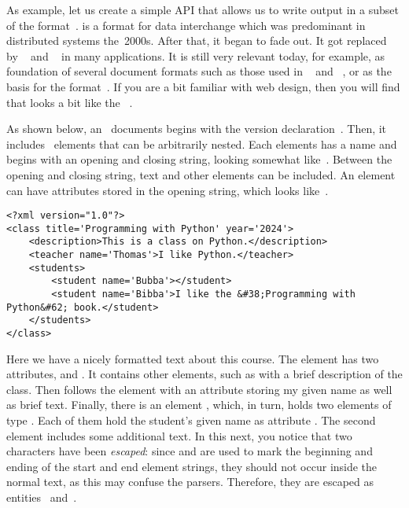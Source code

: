 As example, let us create a simple API that allows us to write output in a subset of the  format~\cite{BPSMM2008EMLX1FE,K2019ITXJY,CH2013XFCAMLTMC}.
 is a format for data interchange which was predominant in distributed systems the~2000s.
After that, it began to fade out.
It got replaced~\cite{A2020XLATDOEOL}  by ~\cite{E2017SE4TJDIS,RFC8259} and ~\cite{DNMAASBE2021YAMLYV1,K2019ITXJY,CGTYB2022YFFDCAIE} in many applications.
It is still very relevant today, for example, as foundation of several document formats such as those used in \libreoffice~\cite{DF2024LTDF,GL2012LTSOOSSCBAFACSOL} and \microsoftWord~\cite{MS2024MW,DR2019STFAWAUMW}, or as the basis for the  format~\cite{DDGLMSWFJJ2011SVGSSE}.
If you are a bit familiar with web design, then you will find that  looks a bit like the ~\cite{HBFLDNOP2014HAVAAAFHAX}.%
%
\begin{sloppypar}%
As shown below, an ~documents begins with the  version declaration~.
Then, it includes ~elements that can be arbitrarily nested.
Each elements has a name and begins with an opening and closing string, looking somewhat like~.
Between the opening and closing string, text and other elements can be included.
An element can have attributes stored in the opening string, which looks like~.%
\end{sloppypar}%
%
\begin{center}
\begin{minipage}{\linewidth}%
\begin{lstlisting}[style=xml_style]
<?xml version="1.0"?>
<class title='Programming with Python' year='2024'>
    <description>This is a class on Python.</description>
    <teacher name='Thomas'>I like Python.</teacher>
    <students>
        <student name='Bubba'></student>
        <student name='Bibba'>I like the &#38;Programming with Python&#62; book.</student>
    </students>
</class>
\end{lstlisting}%
\end{minipage}%
\end{center}%
%
Here we have a nicely formatted  text about this course.
The  element has two attributes,  and .
It contains other elements, such as  with a brief description of the class.
Then follows the element  with an attribute storing my given name as well as brief text.
Finally, there is an element , which, in turn, holds two elements of type .
Each of them hold the student's given name as attribute .
The second  element includes some additional text.
In this next, you notice that two characters have been \emph{escaped}: since \textil{<} and \textil{>} are used to mark the beginning and ending of the start and end element strings, they should not occur inside the normal text, as this may confuse the  parsers.
Therefore, they are escaped as entities~ and~.

